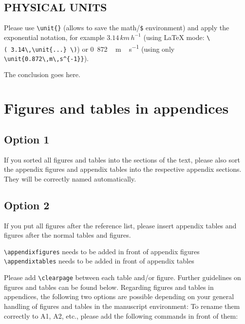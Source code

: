 \documentclass[gc, manuscript]{copernicus}
\begin{document}
\subsection{PHYSICAL UNITS}

Please use \texttt{\textbackslash{}unit\{\}} (allows to save the
math/\texttt{\$} environment) and apply the exponential notation, for
example \(3.14\,\unit{km\,h^{-1}}\) (using LaTeX mode:
\texttt{\textbackslash{}(\ 3.14\textbackslash{},\textbackslash{}unit\{...\}\ \textbackslash{})})
or \unit{0.872\,m\,s^{-1}} (using only
\texttt{\textbackslash{}unit\{0.872\textbackslash{},m\textbackslash{},s\^{}\{-1\}\}}).

\clearpage

\conclusions[Conclusions]

The conclusion goes here.







\appendix
\section{Figures and tables in appendices}
\subsection{Option 1}

If you sorted all figures and tables into the sections of the text,
please also sort the appendix figures and appendix tables into the
respective appendix sections. They will be correctly named
automatically.

\subsection{Option 2}

If you put all figures after the reference list, please insert appendix
tables and figures after the normal tables and figures.

\texttt{\textbackslash{}appendixfigures} needs to be added in front of
appendix figures \texttt{\textbackslash{}appendixtables} needs to be
added in front of appendix tables

Please add \texttt{\textbackslash{}clearpage} between each table and/or
figure. Further guidelines on figures and tables can be found below.
Regarding figures and tables in appendices, the following two options
are possible depending on your general handling of figures and tables in
the manuscript environment: To rename them correctly to A1, A2, etc.,
please add the following commands in front of them:
\noappendix
\end{document}
